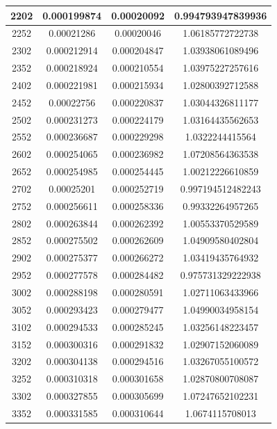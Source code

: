 \documentclass{article}
\begin{document}
\begin{longtable}{|c|c|c|c|}
		2202	&   0.000199874	  & 0.00020092	 &  0.994793947839936   \\ \hline
		2252	&   0.00021286	  & 0.00020046	 &  1.06185772722738   \\ \hline
		2302	&   0.000212914	  & 0.000204847	 &  1.03938061089496   \\ \hline
		2352	&   0.000218924	  & 0.000210554	 &  1.03975227257616   \\ \hline
		2402	&   0.000221981	  & 0.000215934	 &  1.02800392712588   \\ \hline
		2452	&   0.00022756	  & 0.000220837	 &  1.03044326811177   \\ \hline
		2502	&   0.000231273	  & 0.000224179	 &  1.03164435562653   \\ \hline
		2552	&   0.000236687	  & 0.000229298	 &  1.0322244415564   \\ \hline
		2602	&   0.000254065	  & 0.000236982	 &  1.07208564363538   \\ \hline
		2652	&   0.000254985	  & 0.000254445	 &  1.00212226610859   \\ \hline
		2702	&   0.00025201	  & 0.000252719	 &  0.997194512482243   \\ \hline
		2752	&   0.000256611	  & 0.000258336	 &  0.99332264957265   \\ \hline
		2802	&   0.000263844	  & 0.000262392	 &  1.00553370529589   \\ \hline
		2852	&   0.000275502	  & 0.000262609	 &  1.04909580402804   \\ \hline
		2902	&   0.000275377	  & 0.000266272	 &  1.03419435764932   \\ \hline
		2952	&   0.000277578	  & 0.000284482	 &  0.975731329222938   \\ \hline
		3002	&   0.000288198	  & 0.000280591	 &  1.02711063433966   \\ \hline
		3052	&   0.000293423	  & 0.000279477	 &  1.04990034958154   \\ \hline
		3102	&   0.000294533	  & 0.000285245	 &  1.03256148223457   \\ \hline
		3152	&   0.000300316	  & 0.000291832	 &  1.02907152060089   \\ \hline
		3202	&   0.000304138	  & 0.000294516	 &  1.03267055100572   \\ \hline
		3252	&   0.000310318	  & 0.000301658	 &  1.02870800708087   \\ \hline
		3302	&   0.000327855	  & 0.000305699	 &  1.07247652102231   \\ \hline
		3352	&   0.000331585	  & 0.000310644	 &  1.0674115708013   \\ \hline

\end{longtable}
\end{document}
